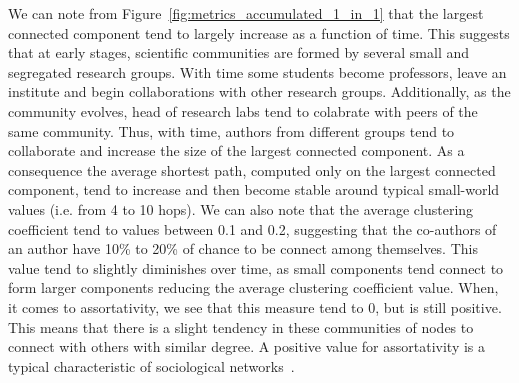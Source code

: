We can note from Figure~\ref{fig:metrics_accumulated_1_in_1} that the largest connected component tend to largely increase as a function of time. This suggests that at early
stages, scientific communities are formed by several small and segregated research groups. 
With time some students become professors, leave an institute and begin collaborations with other research groups. Additionally, as the community evolves, head of research labs
tend to colabrate with peers of the same community. Thus, with time, authors from different groups tend to collaborate and increase the size of the largest connected component. As
a consequence the average shortest path, computed only on the largest connected component, tend to increase and then become stable around typical small-world values (i.e. from 4 to
10 hops).  We can also note that the average clustering coefficient tend to values between 0.1 and 0.2, suggesting that the co-authors of an author have 10\% to 20\% of chance to
be connect among themselves. This value tend to slightly diminishes over time, as small components tend connect to form larger components reducing the average clustering
coefficient value.  When, it comes to assortativity, we see that this measure tend to 0, but is still positive. This means that there is a slight tendency in these communities of nodes to
connect with others with similar degree.  A positive value for assortativity is a typical characteristic of sociological networks~\cite{Newman2003}.

